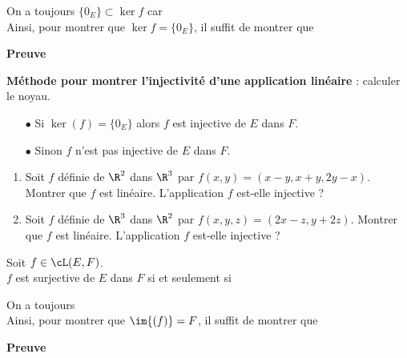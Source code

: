 \documentclass[a4paper, 11pt]{article}
\begin{document}
\begin{rem}
On a toujours $\lbrace 0_E\rbrace\subset \ker f$ car \dotfill\vsec\\
Ainsi, pour montrer que $\ker f=\lbrace 0_E\rbrace$, il suffit de montrer que \dotfill \vsec
\end{rem}

 \textbf{Preuve}

\vspace{6cm}





\begin{dboxminipage}{0.7\textwidth}
\textbf{M\'ethode pour montrer l'injectivit\'e d'une application lin\'eaire} : calculer le noyau.
\begin{itemize}
\item[$\bullet$] Si $\ker{(f)}=\lbrace 0_E\rbrace$ alors $f$ est injective de $E$ dans $F$.
\item[$\bullet$] Sinon $f$ n'est pas injective de $E$ dans $F$.
\end{itemize}
\end{dboxminipage}



{\footnotesize \begin{exercice} 
\begin{enumerate}
\item Soit $f$ d\'efinie de $\R^2$ dans $\R^3$ par $f(x,y)=(x-y, x+y, 2y-x)$. Montrer que $f$ est lin\'eaire. L'application $f$ est-elle injective ? 
\item Soit $f$ d\'efinie de $\R^3$ dans $\R^2$ par $f(x,y,z)=(2x-z,y+2z)$. Montrer que $f$ est lin\'eaire. L'application $f$ est-elle injective ?
\end{enumerate}
\end{exercice}
}


\vspace{0.4cm}


\begin{prop}
Soit $f\in\cL(E,F)$.\vsec\\
\noindent $f$ est surjective de $E$ dans $F$ si et seulement si \dotfill \vsec
\end{prop}
 

\begin{rem}
On a toujours \dotfill\vsec\\
Ainsi, pour montrer que $\im{(f)}=F$, il suffit de montrer que \dotfill \vsec
\end{rem}

\textbf{Preuve}
\vspace{2cm}
\end{document}

